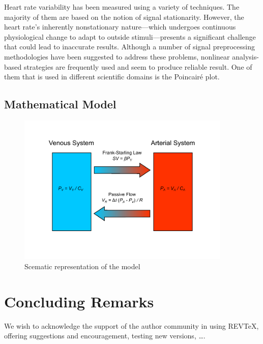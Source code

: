 \documentclass[%
preprint,
 amsmath,amssymb,
 aps,
]{revtex4-2}
\begin{document}
Heart rate variability has been measured using a variety of techniques. The majority of them are based on the notion of signal stationarity. However, the heart rate's inherently nonstationary nature---which undergoes continuous physiological change to adapt to outside stimuli---presents a significant challenge that could lead to inaccurate results. Although a number of signal preprocessing methodologies have been suggested to address these problems, nonlinear analysis-based strategies are frequently used and seem to produce reliable result. One of them that is used in different scientific domains is the Poincairé plot.

\subsection{Mathematical Model}

\begin{figure}
\includegraphics[width=4in]{model.pdf}
\caption{Scematic representation of the model}
\label{fig:model}
\end{figure}

\section{Concluding Remarks}

\begin{acknowledgments}
We wish to acknowledge the support of the author community in using
REV\TeX{}, offering suggestions and encouragement, testing new versions,
\dots.
\end{acknowledgments}



\end{document}
